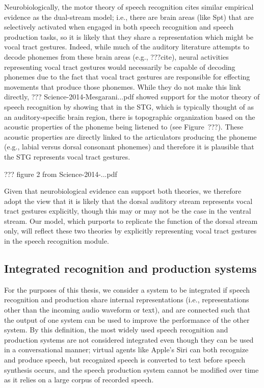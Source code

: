 Neurobiologically,
the motor theory of speech recognition
cites similar empirical evidence as
the dual-stream model;
i.e., there are brain areas (like Spt)
that are selectively activated
when engaged in both speech recognition
and speech production tasks,
so it is likely that they share
a representation which might be vocal tract gestures.
Indeed, while much of the auditory literature
attempts to decode phonemes
from these brain areas
(e.g., ???cite),
neural activities representing vocal tract gestures
would necessarily be capable of
decoding phonemes due to the fact that
vocal tract gestures are responsible
for effecting movements that produce
those phonemes.
While they do not make this link directly,
??? Science-2014-Mesgarani...pdf
showed support for the motor theory of speech recognition
by showing that in the STG,
which is typically thought of
as an auditory-specific brain region,
there is topographic organization
based on the acoustic properties
of the phoneme being listened to
(see Figure~???).
These acoustic properties are
directly linked to the articulators
producing the phoneme
(e.g., labial versus dorsal consonant phonemes)
and therefore it is plausible that
the STG represents vocal tract gestures.

??? figure 2 from Science-2014-...pdf

Given that neurobiological evidence can
support both theories,
we therefore adopt the view that
it is likely that
the dorsal auditory stream
represents vocal tract gestures explicitly,
though this may or may not be the case
in the ventral stream.
Our model, which purports to replicate
the function of the dorsal stream only,
will reflect these two theories
by explicitly representing vocal tract gestures
in the speech recognition module.

\subsection{Integrated recognition and production systems}

For the purposes of this thesis,
we consider a system to be integrated
if speech recognition and production
share internal representations
(i.e., representations other than
the incoming audio waveform or text),
and are connected such that
the output of one system
can be used to improve
the performance of the other system.
By this definition,
the most widely used
speech recognition and production systems
are not considered integrated
even though they can be used
in a conversational manner;
virtual agents like Apple's Siri
can both recognize and produce speech,
but recognized speech is converted
to text before speech synthesis occurs,
and the speech production system
cannot be modified over time
as it relies on a large corpus
of recorded speech.

